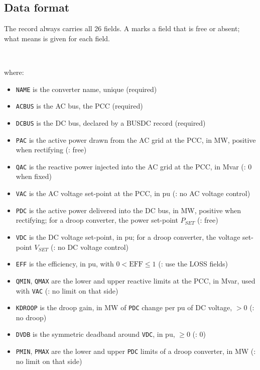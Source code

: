 \subsection{Data format}

The record always carries all 26 fields. A {\tt *} marks a field that is free or absent; what {\tt *} means is given for each field.

\hspace*{5ex}{\tt ACDC NAME ACBUS DCBUS PAC QAC VAC PDC VDC EFF QMIN QMAX KDROOP DVDB}\\
\hspace*{10ex}{\tt PMIN PMAX LOSSA LOSSB LOSSCR LOSSCI KVC RTF XTF BF RC XC BR ;}

where:
\begin{itemize}
\item {\tt NAME} is the converter name, unique (required)
\item {\tt ACBUS} is the AC bus, the PCC (required)
\item {\tt DCBUS} is the DC bus, declared by a BUSDC record (required)
\item {\tt PAC} is the active power drawn from the AC grid at the PCC, in MW, positive when rectifying ({\tt *}: free)
\item {\tt QAC} is the reactive power injected into the AC grid at the PCC, in Mvar ({\tt *}: 0 when fixed)
\item {\tt VAC} is the AC voltage set-point at the PCC, in pu ({\tt *}: no AC voltage control)
\item {\tt PDC} is the active power delivered into the DC bus, in MW, positive when rectifying; for a droop converter, the power set-point $P_{SET}$ ({\tt *}: free)
\item {\tt VDC} is the DC voltage set-point, in pu; for a droop converter, the voltage set-point $V_{SET}$ ({\tt *}: no DC voltage control)
\item {\tt EFF} is the efficiency, in pu, with $0 < \mbox{EFF} \le 1$ ({\tt *}: use the LOSS fields)
\item {\tt QMIN}, {\tt QMAX} are the lower and upper reactive limits at the PCC, in Mvar, used with {\tt VAC} ({\tt *}: no limit on that side)
\item {\tt KDROOP} is the droop gain, in MW of {\tt PDC} change per pu of DC voltage, $> 0$ ({\tt *}: no droop)
\item {\tt DVDB} is the symmetric deadband around {\tt VDC}, in pu, $\ge 0$ ({\tt *}: 0)
\item {\tt PMIN}, {\tt PMAX} are the lower and upper {\tt PDC} limits of a droop converter, in MW ({\tt *}: no limit on that side)

\end{itemize}
